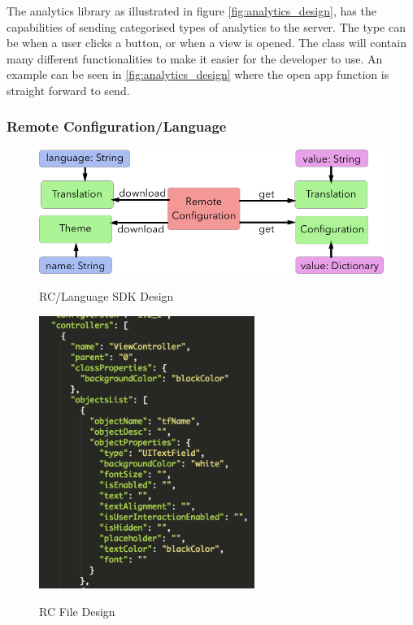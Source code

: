 The analytics library as illustrated in figure \ref{fig:analytics_design}, has the capabilities of sending categorised types of analytics to the server. The type can be when a user clicks a button, or when a view is opened. The class will contain many different functionalities to make it easier for the developer to use. An example can be seen in \ref{fig:analytics_design} where the open app function is straight forward to send.

\subsubsection{Remote Configuration/Language} \label{d-sdk:rc_l}

\begin{figure}[!h]
    \caption{RC/Language SDK Design}
    \centering
    \includegraphics[width=120mm]{images/design/remote_config}
    \label{fig:remote_config_design}
\end{figure}


\begin{figure}[!h]
    \caption{RC File Design}
    \centering
    \includegraphics[width=70mm]{images/design/rc_file}
    \label{fig:rc_file_design}
\end{figure}


